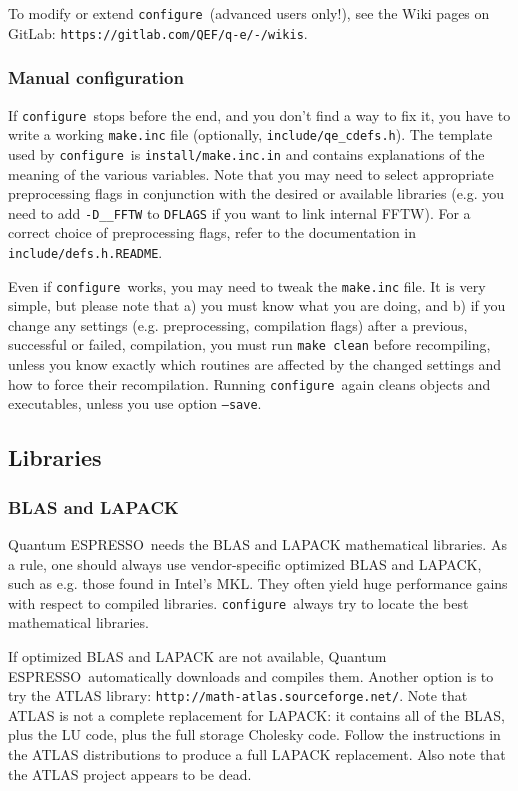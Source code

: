 \documentclass[12pt,a4paper]{article}
\def\qe{{\sc Quantum ESPRESSO}}
\def\configure{\texttt{configure}}
\begin{document}
To modify or extend \configure\ (advanced users only!), see the Wiki pages
on GitLab: \texttt{https://gitlab.com/QEF/q-e/-/wikis}.

\subsubsection{Manual configuration}
\label{SubSec:manconf}
If \configure\ stops before the end, and you don't find a way to fix
it, you have to write a working \texttt{make.inc} file (optionally,
\texttt{include/qe\_cdefs.h}). The template used by \configure\ is
\texttt{install/make.inc.in} and contains explanations of the meaning
of the various variables. Note that you may need
to select appropriate preprocessing flags
in conjunction with the desired or available
libraries (e.g. you need to add \texttt{-D\_\_FFTW} to \texttt{DFLAGS}
if you want to link internal FFTW). For a correct choice of preprocessing
flags, refer to the documentation in \texttt{include/defs.h.README}.

Even if \configure\ works, you may need to tweak the \texttt{make.inc}
file. It is very simple, but please note that a) you must know what you are
doing, and b) if you change any settings
(e.g. preprocessing, compilation flags)
after a previous, successful or failed, compilation, you must run
\texttt{make clean} before recompiling, unless you know exactly which
routines are affected by the changed settings and how to force their
recompilation. Running \configure\ again cleans objects and executables,
unless you use option \texttt{--save}.

\subsection{Libraries}
\label{Sec:Libraries}

\subsubsection{BLAS and LAPACK}
\qe\ needs the BLAS and LAPACK mathematical libraries.
As a rule, one should always use vendor-specific optimized 
BLAS and LAPACK, such as e.g. those found in Intel's MKL. 
They often yield huge performance gains with respect to 
compiled libraries. \configure\ always try to locate the 
best mathematical libraries.

If optimized BLAS and LAPACK are not available, \qe\ automatically 
downloads and compiles them. Another option is to try the ATLAS library: 
\texttt{http://math-atlas.sourceforge.net/}.
Note that ATLAS is not a complete replacement for LAPACK: it contains
all of the BLAS, plus the LU code, plus the full storage Cholesky code.
Follow the instructions in the ATLAS distributions to produce a full 
LAPACK replacement. Also note that the ATLAS project appears to be dead.
\end{document}
